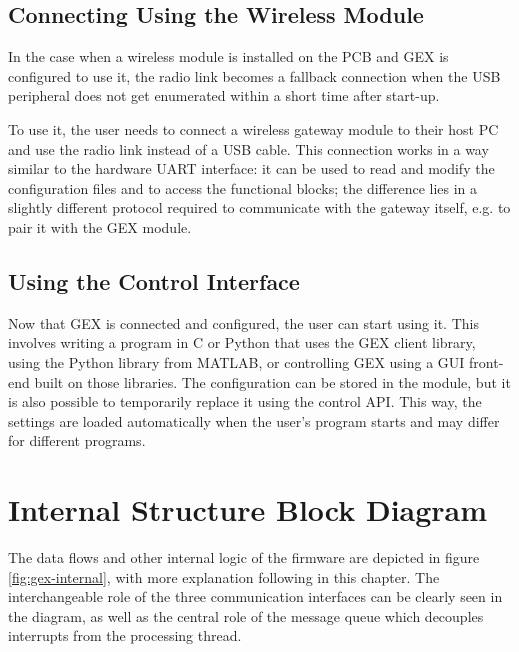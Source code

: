 \subsection{Connecting Using the Wireless Module}

In the case when a wireless module is installed on the \gls{PCB} and GEX is configured to use it, the radio link becomes a fallback connection when the \gls{USB} peripheral does not get enumerated within a short time after start-up.

To use it, the user needs to connect a wireless gateway module to their host \gls{PC} and use the radio link instead of a \gls{USB} cable. This connection works in a way similar to the hardware UART interface: it can be used to read and modify the configuration files and to access the functional blocks; the difference lies in a slightly different protocol required to communicate with the gateway itself, e.g. to pair it with the GEX module.

\subsection{Using the Control Interface}

Now that GEX is connected and configured, the user can start using it. This involves writing a program in C or Python that uses the GEX client library, using the Python library from MATLAB, or controlling GEX using a \gls{GUI} front-end built on those libraries. The configuration can be stored in the module, but it is also possible to temporarily replace it using the control \gls{API}. This way, the settings are loaded automatically when the user's program starts and may differ for different programs.

\section{Internal Structure Block Diagram}

The data flows and other internal logic of the firmware are depicted in figure \ref{fig:gex-internal}, with more explanation following in this chapter. The interchangeable role of the three communication interfaces can be clearly seen in the diagram, as well as the central role of the message queue which decouples interrupts from the processing thread.

